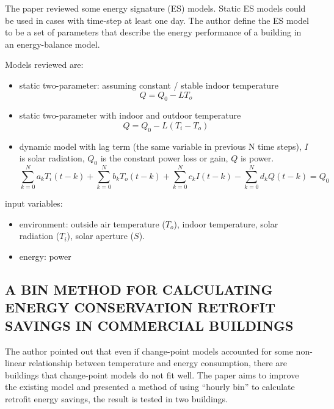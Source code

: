 \documentclass[12pt]{article}
\begin{document}
The paper reviewed some energy
signature (ES) models. Static ES models could be used in cases with
time-step at least one day. The author define the ES model to be a set
of parameters that describe the energy performance of a building in an
energy-balance model.

Models reviewed are:
\begin{itemize}
\item static two-parameter: assuming constant / stable indoor temperature
  \begin{equation}
    \label{eq:2p-model}
    Q = Q_0 - LT_o
  \end{equation}
\item static two-parameter with indoor and outdoor temperature
  \begin{equation}
    \label{eq:2p-model-intercept}
    Q = Q_0 - L(T_i - T_o)
  \end{equation}
\item dynamic model with lag term (the same variable in previous N
  time steps), $I$ is solar radiation, $Q_0$ is the constant power
  loss or gain, $Q$ is power.
  \begin{equation}
    \label{eq:dyn-model}
    \sum_{k = 0}^N a_k T_i(t - k) + \sum_{k = 0}^N b_k T_o(t - k) + \sum_{k = 0}^N c_k I(t - k) - \sum_{k = 0}^N d_k Q(t - k) = Q_0
  \end{equation}
\end{itemize}

input variables:
\begin{itemize}
\item environment: outside air temperature ($T_o$), indoor temperature, solar radiation
  ($T_i$), solar aperture ($S$).
\item energy: power
\end{itemize}

\subsection{A BIN METHOD FOR CALCULATING ENERGY CONSERVATION RETROFIT SAVINGS IN
COMMERCIAL BUILDINGS~\cite{haberl1994bin}}
The author pointed out that even if change-point models accounted for
some non-linear relationship between temperature and energy
consumption, there are buildings that change-point models do not fit
well. The paper aims to improve the existing model and presented a
method of using ``hourly bin'' to calculate retrofit energy savings,
the result is tested in two buildings.
\end{document}
